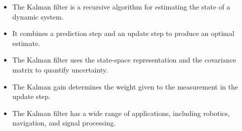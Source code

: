 \documentclass[11pt,a4paper]{article}
\begin{document}
\begin{summary}
  \begin{itemize}
    \item The Kalman filter is a recursive algorithm for estimating the state of a dynamic system.
    \item It combines a prediction step and an update step to produce an optimal estimate.
    \item The Kalman filter uses the state-space representation and the covariance matrix to quantify uncertainty.
    \item The Kalman gain determines the weight given to the measurement in the update step.
    \item The Kalman filter has a wide range of applications, including robotics, navigation, and signal processing.
  \end{itemize}
\end{summary}
\end{document}
